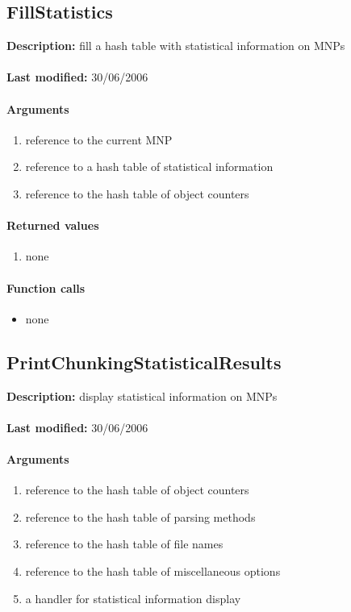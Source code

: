\subsection{FillStatistics}
\textbf{Description:} fill a hash table with statistical information on MNPs\\
\\\textbf{Last modified:} 30/06/2006

\paragraph{Arguments}
\begin{enumerate}
\item reference to the current MNP
\item reference to a hash table of statistical information
\item reference to the hash table of object counters
\end{enumerate}

\paragraph{Returned values}
\begin{enumerate}
\item none
\end{enumerate}

\paragraph{Function calls}
\begin{itemize}
\item none
\end{itemize}

\subsection{PrintChunkingStatisticalResults}
\textbf{Description:} display statistical information on MNPs\\
\\\textbf{Last modified:} 30/06/2006

\paragraph{Arguments}
\begin{enumerate}
\item reference to the hash table of object counters
\item reference to the hash table of parsing methods
\item reference to the hash table of file names
\item reference to the hash table of miscellaneous options
\item a handler for statistical information display
\end{enumerate}

